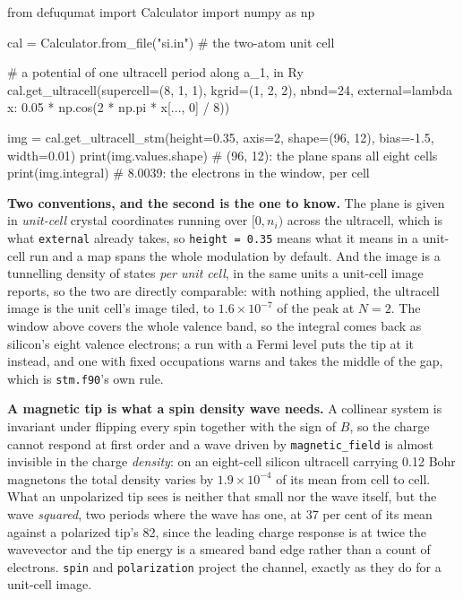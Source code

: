 \documentclass[11pt,a4paper]{article}
\newcommand{\code}[1]{\texttt{\small #1}}
\begin{document}
\begin{pycode}
from defuqumat import Calculator
import numpy as np

cal = Calculator.from_file("si.in")        # the two-atom unit cell

# a potential of one ultracell period along a_1, in Ry
cal.get_ultracell(supercell=(8, 1, 1), kgrid=(1, 2, 2), nbnd=24,
                  external=lambda x: 0.05 * np.cos(2 * np.pi * x[..., 0] / 8))

img = cal.get_ultracell_stm(height=0.35, axis=2, shape=(96, 12),
                            bias=-1.5, width=0.01)
print(img.values.shape)        # (96, 12): the plane spans all eight cells
print(img.integral)            # 8.0039: the electrons in the window, per cell
\end{pycode}

\textbf{Two conventions, and the second is the one to know.} The plane is given
in \emph{unit-cell} crystal coordinates running over $[0, n_i)$ across the
ultracell, which is what \code{external} already takes, so \code{height = 0.35}
means what it means in a unit-cell run and a map spans the whole modulation by
default. And the image is a tunnelling density of states \emph{per unit cell},
in the same units a unit-cell image reports, so the two are directly
comparable: with nothing applied, the ultracell image is the unit cell's image
tiled, to $1.6\times10^{-7}$ of the peak at $N = 2$. The window above covers the
whole valence band, so the integral comes back as silicon's eight valence
electrons; a run with a Fermi level puts the tip at it instead, and one with
fixed occupations warns and takes the middle of the gap, which is
\code{stm.f90}'s own rule.

\textbf{A magnetic tip is what a spin density wave needs.} A collinear system is
invariant under flipping every spin together with the sign of $B$, so the charge
cannot respond at first order and a wave driven by \code{magnetic\_field} is
almost invisible in the charge \emph{density}: on an eight-cell silicon
ultracell carrying 0.12 Bohr magnetons the total density varies by
$1.9\times10^{-4}$ of its mean from cell to cell. What an unpolarized tip sees
is neither that small nor the wave itself, but the wave \emph{squared}, two
periods where the wave has one, at 37 per cent of its mean against a polarized
tip's 82, since the leading charge response is at twice the wavevector and the
tip energy is a smeared band edge rather than a count of electrons.
\code{spin} and \code{polarization} project the channel, exactly as they do for
a unit-cell image.
\end{document}
